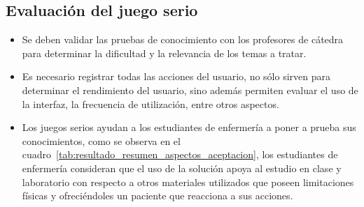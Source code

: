 \subsection{Evaluación del juego serio}

\begin{itemize}

\item Se deben validar las pruebas de conocimiento con los profesores de cátedra para
    determinar la dificultad y la relevancia de los temas a tratar.

\item Es necesario registrar todas las acciones del usuario, no sólo sirven para
    determinar el rendimiento del usuario, sino además permiten evaluar el uso
    de la interfaz, la frecuencia de utilización, entre otros aspectos.

\item Los juegos serios ayudan a los estudiantes de enfermería a poner a prueba
    sus conocimientos, como se observa en el
    cuadro~\ref{tab:resultado_resumen_aspectos_aceptacion}, los estudiantes de
    enfermería consideran que el uso de la solución apoya al estudio en clase y
    laboratorio con respecto a otros materiales utilizados que poseen
    limitaciones físicas y ofreciéndoles un paciente que reacciona a sus
    acciones. 

\end{itemize}
